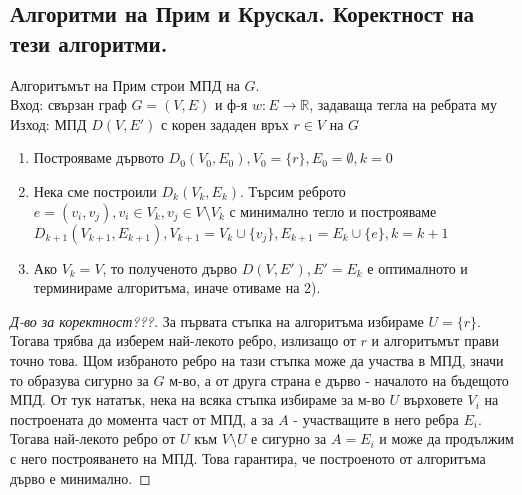 \subsection{Алгоритми на Прим и Крускал. Коректност на тези алгоритми.}

\begin{alg}[на Прим]
    Алгоритъмът на Прим строи МПД на \(G\). \\
    Вход: свързан граф \(G = (V, E)\) и ф-я \(w: E \to \mathbb{R}\), задаваща тегла на 
    ребрата му \\
    Изход: МПД \(D(V, E')\) с корен зададен връх \(r \in V\) на \(G\)
    \begin{enumerate}
        \item Построяваме дървото \(D_0(V_0, E_0), V_0 = \{r\}, E_0 = \emptyset, k = 0\)
        \item Нека сме построили \(D_k(V_k, E_k)\). Търсим реброто \(e = (v_i, v_j), v_i \in V_k, 
        v_j \in V \setminus V_k\) с минимално тегло и построяваме \(D_{k + 1} (V_{k + 1}, E_{k + 1}), 
        V_{k + 1} = V_k \cup \{v_j\}, E_{k + 1} = E_k \cup \{e\}, k = k + 1\)
        \item Ако \(V_k = V\), то полученото дърво \(D(V, E'), E' = E_k\) е оптималното и терминираме 
        алгоритъма, иначе отиваме на 2).
    \end{enumerate}
\end{alg}

\begin{proof}[Д-во за коректност???]
    За първата стъпка на алгоритъма избираме \(U = \{r\}\). Тогава трябва да изберем най-лекото ребро, 
    излизащо от \(r\) и алгоритъмът прави точно това. Щом избраното ребро на тази стъпка може да участва 
    в МПД, значи то образува сигурно за \(G\) м-во, а от друга страна е дърво - началото на 
    бъдещото МПД. От тук нататък, нека на всяка стъпка избираме за м-во \(U\) върховете \(V_i\) на 
    построената до момента част от МПД, а за \(A\) - участващите в него ребра \(E_i\). Тогава 
    най-лекото ребро от \(U\) към \(V \setminus U\) е сигурно за \(A = E_i\) и може да продължим с него 
    построяването на МПД. Това гарантира, че построеното от алгоритъма дърво е минимално.
\end{proof}

